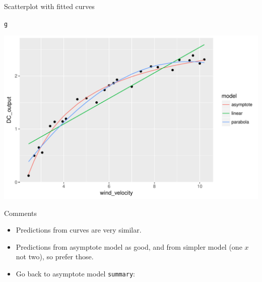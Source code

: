 \documentclass[unknownkeysallowed]{beamer}\usepackage[]{graphicx}\usepackage[]{color}
\makeatletter
\def\maxwidth{ %
  \ifdim\Gin@nat@width>\linewidth
    \linewidth
  \else
    \Gin@nat@width
  \fi
}
\newcommand{\hlstd}[1]{\textcolor[rgb]{0.345,0.345,0.345}{#1}}%
\newenvironment{kframe}{%
 \def\at@end@of@kframe{}%
 \ifinner\ifhmode%
  \def\at@end@of@kframe{\end{minipage}}%
  \begin{minipage}{\columnwidth}%
 \fi\fi%
 \def\FrameCommand##1{\hskip\@totalleftmargin \hskip-\fboxsep
 \colorbox{shadecolor}{##1}\hskip-\fboxsep
     \hskip-\linewidth \hskip-\@totalleftmargin \hskip\columnwidth}%
 \MakeFramed {\advance\hsize-\width
   \@totalleftmargin\z@ \linewidth\hsize
   \@setminipage}}%
 {\par\unskip\endMakeFramed%
 \at@end@of@kframe}
\newenvironment{knitrout}{}{} %
\makeatother
\begin{document}
\begin{frame}[fragile]{Scatterplot with fitted curves}

\begin{knitrout}
\color{fgcolor}\begin{kframe}
\begin{alltt}
\hlstd{g}
\end{alltt}
\end{kframe}
\includegraphics[width=\maxwidth]{figure/unnamed-chunk-243-1} 

\end{knitrout}
  
\end{frame}

\begin{frame}[fragile]{Comments}

  \begin{itemize}
  \item Predictions from curves are very similar.
  \item Predictions from asymptote model as good, and from simpler
    model (one $x$ not two), so prefer those.
  \item Go back to asymptote model \texttt{summary}:
  \end{itemize}
  
\end{frame}
\end{document}
